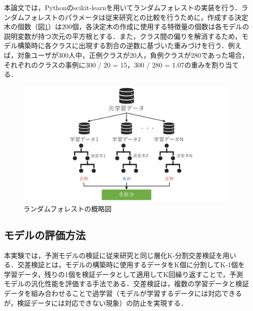 \documentclass[11pt,dvipdfmx]{jreport}
\begin{document}
本論文では，Pythonのscikit-learnを用いてランダムフォレストの実装を行う．ランダムフォレストのパラメータは従来研究との比較を行うために，作成する決定木の個数（図\ref{fig:random-forest}）は200個，各決定木の作成に使用する特徴量の個数は各モデルの説明変数が持つ次元の平方根とする．また，クラス間の偏りを解消するため，モデル構築時に各クラスに出現する割合の逆数に基づいた重みづけを行う．例えば，対象ユーザが300人中，正例クラスが20人，負例クラスが280であった場合，それぞれのクラスの事例に300 / 20 = 15，300 / 280 = 1.07の重みを割り当てる．

\begin{figure}[t]
	\centering
	\includegraphics[width=1.0\linewidth]{Okamoto_fig/random-forest.pdf}
	\caption{ランダムフォレストの概略図}
	\label{fig:random-forest}
\end{figure}


\subsection{モデルの評価方法}
本実験では，予測モデルの検証に従来研究と同じ層化K-分割交差検証を用いる．交差検証とは，モデルの構築時に使用するデータをK個に分割してK-1個を学習データ，残りの1個を検証データとして適用してK回繰り返すことで，予測モデルの汎化性能を評価する手法である．交差検証は，複数の学習データと検証データを組み合わせることで過学習（モデルが学習するデータには対応できるが，検証データには対応できない現象）の防止を実現する．
\end{document}
